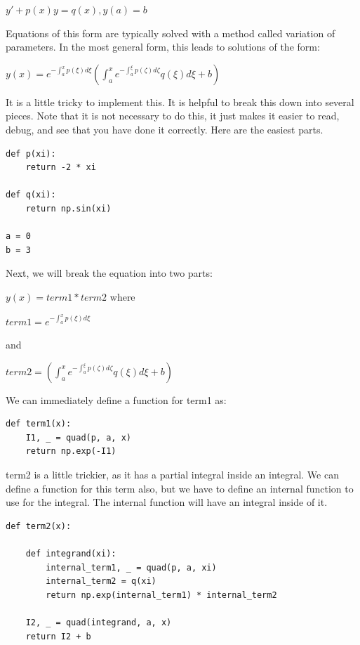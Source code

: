 \documentclass[11pt]{article}
\begin{document}
\(y' + p(x) y = q(x), y(a)=b\)

Equations of this form are typically solved with a method called variation of parameters. In the most general form, this leads to solutions of the form:

\(y(x) = e^{-\int_a^x p(\xi)d\xi}\left(\int_a^x e^{-\int_a^{\xi} p(\zeta)d\zeta} q(\xi)d\xi + b\right)\)

It is a little tricky to implement this. It is helpful to break this down into several pieces. Note that it is not necessary to do this, it just makes it easier to read, debug, and see that you have done it correctly. Here are the easiest parts.

\begin{verbatim}
def p(xi):
    return -2 * xi

def q(xi):
    return np.sin(xi)

a = 0
b = 3
\end{verbatim}

Next, we will break the equation into two parts:

\(y(x) = term1 * term2\) where

\(term1 = e^{-\int_a^x p(\xi)d\xi}\)

and

\(term2 = \left(\int_a^x e^{-\int_a^{\xi} p(\zeta)d\zeta} q(\xi)d\xi + b\right)\)

We can immediately define a function for term1 as:

\begin{verbatim}
def term1(x):
    I1, _ = quad(p, a, x)
    return np.exp(-I1)
\end{verbatim}

term2 is a little trickier, as it has a partial integral inside an integral. We can define a function for this term also, but we have to define an internal function to use for the integral. The internal function will have an integral inside of it.

\begin{verbatim}
def term2(x):

    def integrand(xi):
        internal_term1, _ = quad(p, a, xi)
        internal_term2 = q(xi)
        return np.exp(internal_term1) * internal_term2

    I2, _ = quad(integrand, a, x)
    return I2 + b
\end{verbatim}
\end{document}
